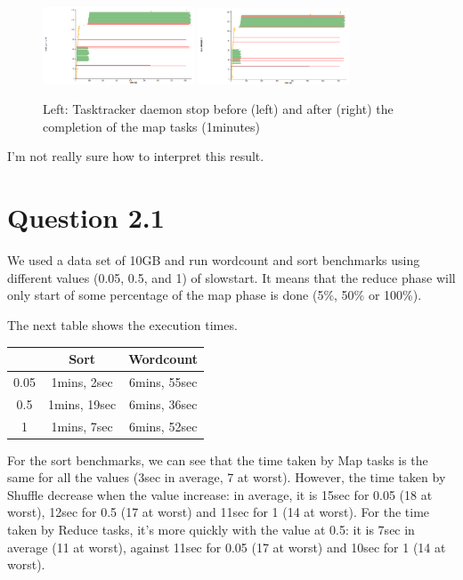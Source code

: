 \documentclass{article}
\begin{document}
\begin{figure}%
  \centering
  \includegraphics[width=0.4\textwidth]{expiry1before.png}
  \includegraphics[width=0.4\textwidth]{expiry1after.png}
  \caption{Left: Tasktracker daemon stop before (left) and after (right) the completion of the map tasks (1minutes)}
  \label{kill}
\end{figure}




I'm not really sure how to interpret this result.

\section*{Question 2.1}


We used a data set of 10GB and run wordcount and sort benchmarks using
different values (0.05, 0.5, and 1) of slowstart.
It means that the reduce phase will only start of some percentage of the map phase is done (5\%, 50\% or 100\%).

The next table shows the execution times.

\begin{center}
\begin{tabular}{|c|c|c|}
\hline
\ & Sort & Wordcount \\
\hline
0.05 & 1mins, 2sec & 6mins, 55sec \\
\hline
0.5 & 1mins, 19sec & 6mins, 36sec \\
\hline
1 & 1mins, 7sec & 6mins, 52sec \\
\hline
\end{tabular}
\end{center}

For the sort benchmarks, we can see that the time taken by Map tasks is the same for all the values (3sec in average, 7 at worst).
However, the time taken by Shuffle decrease when the value increase: in average, it is 15sec for 0.05 (18 at worst), 12sec for 0.5 (17 at worst) and 11sec for 1 (14 at worst). For the time taken by Reduce tasks, it's more quickly with the value at 0.5: it is 7sec in average (11 at worst), against 11sec for 0.05 (17 at worst) and 10sec for 1 (14 at worst).
\end{document}
